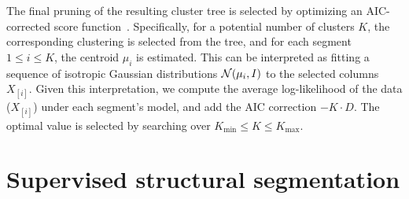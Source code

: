 \documentclass{article}
\begin{document}
The final pruning of the resulting cluster tree is selected by optimizing an AIC-corrected score 
function~\cite{akaike1973information}.  Specifically, for a potential number of clusters $K$, the corresponding
clustering is selected from the tree, and for each segment $1 \leq i \leq K$, the centroid $\mu_i$ is estimated.  
This can be interpreted as fitting a sequence of isotropic Gaussian distributions $\mathcal{N}(\mu_i, I)$ to the selected 
columns $X_{[i]}$. Given this interpretation, we compute the average log-likelihood of the data ($X_{[i]}$) under 
each segment's model, and add the AIC correction $-K\cdot D$.  The optimal value is selected by searching over
$K_{\min} \leq K \leq K_{\max}$.

\section{Supervised structural segmentation}
\label{sec:supervised}


\end{document}
